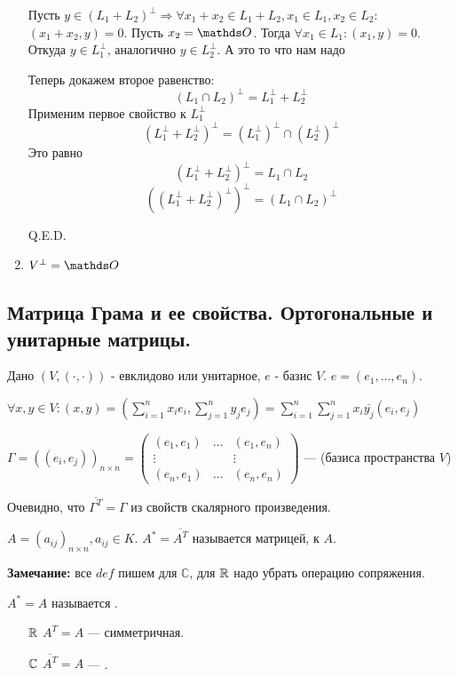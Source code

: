 \begin{enumerate}
    Пусть $y \in (L_1 + L_2)^\perp \Rightarrow \forall x_1 + x_2 \in L_1 + L_2,x_1 \in L_1, x_2 \in L_2$: $(x_1+x_2,y)=0$. Пусть $x_2 = \zero$. Тогда $\forall x_1 \in L_1: (x_1 , y)=0$. Откуда $y \in L_1^\perp$, аналогично $y \in L_2^\perp$. А это то что нам надо

    Теперь докажем второе равенство:
$$(L_1 \cap L_2)^\perp = L_1^{\perp}+ L_2^{\perp}$$
    Применим первое свойство к $L_1^{\perp}$ 
    $$(L_1^\perp + L_2^\perp)^\perp = (L_1^\perp)^\perp \cap (L_2^\perp)^\perp$$
   Это равно
    $$(L_1^\perp + L_2^\perp)^\perp = L_1 \cap L_2$$
    $$((L_1^\perp + L_2^\perp)^\perp )^\perp= (L_1 \cap L_2)^\perp$$
        
    
    \hfill Q.E.D.
    \item $V^\perp  = \zero$
   
\end{enumerate}

\pagebreak
\subsection{Матрица Грама и ее свойства. Ортогональные и унитарные матрицы.}

Дано $(V, (\cdot,\cdot))$ - евклидово или унитарное, $e$ - базис $V$. $e=(e_1,\ldots, e_n)$.

$\forall x,y \in V: (x,y) = (\sum\limits_{i=1}^n x_i e_i, \sum\limits_{j=1}^n y_j e_j) = \sum\limits_{i=1}^n\sum\limits_{j=1}^n x_i \overline{y_j} (e_i, e_j)$

 $\Gamma  = ((e_i,e_j))_{n\times n} = \begin{pmatrix}
    (e_1,e_1) & \ldots & (e_1, e_n)\\
    \vdots & &\vdots\\
    (e_n,e_1) & \ldots & (e_n,e_n)
\end{pmatrix}$ --- (базиса пространства $V$)

Очевидно, что $\overline{\Gamma^T}  = \Gamma$ из свойств скалярного произведения.

 $A = (a_{ij})_{n \times n}, a_{ij} \in K$. $A^* = \overline{A^T}$ называется матрицей,  к $A$.

\textbf{Замечание:} все $def$ пишем для $\mathbb{C}$, для $\mathbb{R}$ надо убрать операцию сопряжения.

 $A^* = A$ называется .
\begin{enumerate}
    \item[$\mathbb{R}$] $A^T = A$ --- симметричная.
    \item[$\mathbb{C}$] $\overline{A^T}=A$  --- .
\end{enumerate}

